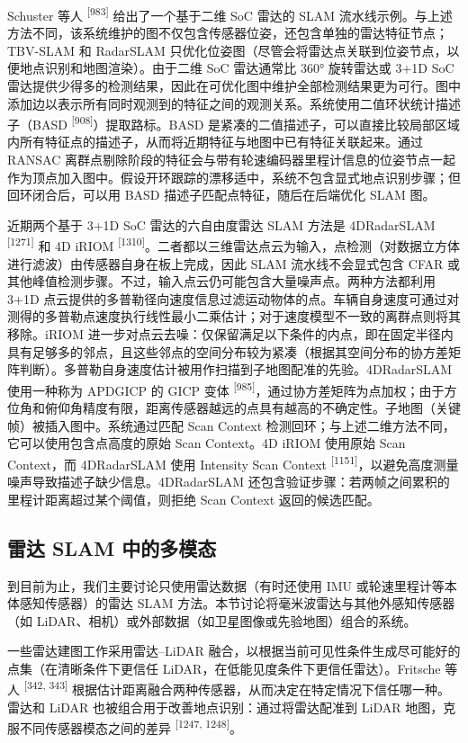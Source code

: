 Schuster 等人 \textsuperscript{[983]} 给出了一个基于二维 SoC 雷达的 SLAM 流水线示例。与上述方法不同，该系统维护的图不仅包含传感器位姿，还包含单独的雷达特征节点；TBV-SLAM 和 RadarSLAM 只优化位姿图（尽管会将雷达点关联到位姿节点，以便地点识别和地图渲染）。由于二维 SoC 雷达通常比 360° 旋转雷达或 3+1D SoC 雷达提供少得多的检测结果，因此在可优化图中维护全部检测结果更为可行。图中添加边以表示所有同时观测到的特征之间的观测关系。系统使用二值环状统计描述子（BASD \textsuperscript{[908]}）提取路标。BASD 是紧凑的二值描述子，可以直接比较局部区域内所有特征点的描述子，从而将近期特征与地图中已有特征关联起来。通过 RANSAC 离群点剔除阶段的特征会与带有轮速编码器里程计信息的位姿节点一起作为顶点加入图中。假设开环跟踪的漂移适中，系统不包含显式地点识别步骤；但回环闭合后，可以用 BASD 描述子匹配点特征，随后在后端优化 SLAM 图。

近期两个基于 3+1D SoC 雷达的六自由度雷达 SLAM 方法是 4DRadarSLAM \textsuperscript{[1271]} 和 4D iRIOM \textsuperscript{[1310]}。二者都以三维雷达点云为输入，点检测（对数据立方体进行滤波）由传感器自身在板上完成，因此 SLAM 流水线不会显式包含 CFAR 或其他峰值检测步骤。不过，输入点云仍可能包含大量噪声点。两种方法都利用 3+1D 点云提供的多普勒径向速度信息过滤运动物体的点。车辆自身速度可通过对测得的多普勒点速度执行线性最小二乘估计；对于速度模型不一致的离群点则将其移除。iRIOM 进一步对点云去噪：仅保留满足以下条件的内点，即在固定半径内具有足够多的邻点，且这些邻点的空间分布较为紧凑（根据其空间分布的协方差矩阵判断）。多普勒自身速度估计被用作扫描到子地图配准的先验。4DRadarSLAM 使用一种称为 APDGICP 的 GICP 变体 \textsuperscript{[985]}，通过协方差矩阵为点加权；由于方位角和俯仰角精度有限，距离传感器越远的点具有越高的不确定性。子地图（关键帧）被插入图中。系统通过匹配 Scan Context 检测回环；与上述二维方法不同，它可以使用包含点高度的原始 Scan Context。4D iRIOM 使用原始 Scan Context，而 4DRadarSLAM 使用 Intensity Scan Context \textsuperscript{[1151]}，以避免高度测量噪声导致描述子缺少信息。4DRadarSLAM 还包含验证步骤：若两帧之间累积的里程计距离超过某个阈值，则拒绝 Scan Context 返回的候选匹配。

\subsection{雷达 SLAM 中的多模态}

到目前为止，我们主要讨论只使用雷达数据（有时还使用 IMU 或轮速里程计等本体感知传感器）的雷达 SLAM 方法。本节讨论将毫米波雷达与其他外感知传感器（如 LiDAR、相机）或外部数据（如卫星图像或先验地图）组合的系统。

一些雷达建图工作采用雷达--LiDAR 融合，以根据当前可见性条件生成尽可能好的点集（在清晰条件下更信任 LiDAR，在低能见度条件下更信任雷达）。Fritsche 等人 \textsuperscript{[342, 343]} 根据估计距离融合两种传感器，从而决定在特定情况下信任哪一种。雷达和 LiDAR 也被组合用于改善地点识别：通过将雷达配准到 LiDAR 地图，克服不同传感器模态之间的差异 \textsuperscript{[1247, 1248]}。

